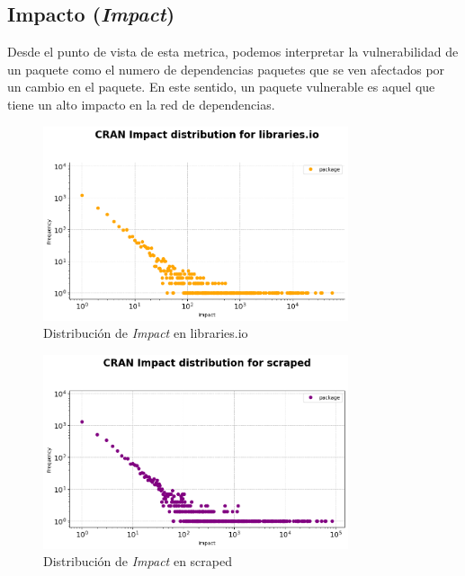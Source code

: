 \subsection{Impacto (\textit{Impact})}

Desde el punto de vista de esta metrica, podemos interpretar la vulnerabilidad de un paquete como el numero
de dependencias paquetes que se ven afectados por un cambio en el paquete. En este sentido, un paquete
vulnerable es aquel que tiene un alto impacto en la red de dependencias.

\begin{figure}[ht!]
    \begin{center}
        \includegraphics[width=0.8\textwidth]{img/cran/impact_dist_libio.png}
        \caption{Distribución de \textit{Impact} en libraries.io}
        \label{fig:Distribución de Impact en libraries.io}
    \end{center}
\end{figure}

\begin{figure}[ht!]
    \begin{center}
        \includegraphics[width=0.8\textwidth]{img/cran/impact_dist_scraped.png}
        \caption{Distribución de \textit{Impact} en scraped}
        \label{fig:Distribución de Impact en scraped}
    \end{center}
\end{figure}

